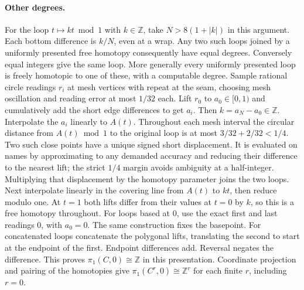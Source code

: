 \paragraph{Other degrees.}
For the loop $t\mapsto kt\bmod 1$ with $k\in\mathbb Z$, take $N>8(1+|k|)$ in this argument. Each bottom difference is $k/N$, even at a wrap. Any two such loops joined by a uniformly presented free homotopy consequently have equal degrees. Conversely equal integers give the same loop. More generally every uniformly presented loop is freely homotopic to one of these, with a computable degree. Sample rational circle readings $r_i$ at mesh vertices with repeat at the seam, choosing mesh oscillation and reading error at most $1/32$ each. Lift $r_0$ to $a_0\in[0,1)$ and cumulatively add the short edge differences to get $a_i$. Then $k=a_N-a_0\in\mathbb Z$. Interpolate the $a_i$ linearly to $A(t)$. Throughout each mesh interval the circular distance from $A(t)\bmod1$ to the original loop is at most $3/32+2/32<1/4$. Two such close points have a unique signed short displacement. It is evaluated on names by approximating to any demanded accuracy and reducing their difference to the nearest lift; the strict $1/4$ margin avoids ambiguity at a half-integer. Multiplying that displacement by the homotopy parameter joins the two loops. Next interpolate linearly in the covering line from $A(t)$ to $kt$, then reduce modulo one. At $t=1$ both lifts differ from their values at $t=0$ by $k$, so this is a free homotopy throughout. For loops based at $0$, use the exact first and last readings $0$, with $a_0=0$. The same construction fixes the basepoint. For concatenated loops concatenate the polygonal lifts, translating the second to start at the endpoint of the first. Endpoint differences add. Reversal negates the difference. This proves $\pi_1(C,0)\cong\mathbb Z$ in this presentation. Coordinate projection and pairing of the homotopies give $\pi_1(C^r,0)\cong\mathbb Z^r$ for each finite $r$, including $r=0$.

